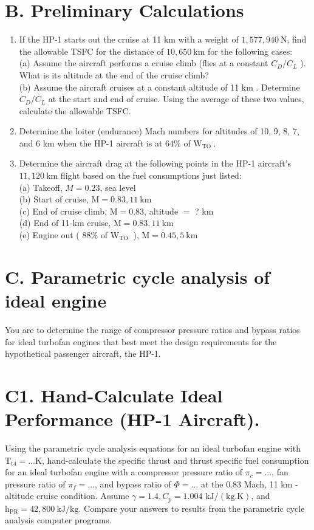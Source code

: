 \documentclass[10pt]{article}
\begin{document}
\section*{B. Preliminary Calculations}
\begin{enumerate}
  \item If the HP-1 starts out the cruise at 11 km with a weight of $1,577,940 \mathrm{~N}$, find the allowable TSFC for the distance of $10,650 \mathrm{~km}$ for the following cases:\\
(a) Assume the aircraft performs a cruise climb (flies at a constant $C_{D} / C_{L}$ ). What is its altitude at the end of the cruise climb?\\
(b) Assume the aircraft cruises at a constant altitude of 11 km . Determine $C_{D} / C_{L}$ at the start and end of cruise. Using the average of these two values, calculate the allowable TSFC.
  \item Determine the loiter (endurance) Mach numbers for altitudes of 10, 9, 8, 7, and 6 km when the HP-1 aircraft is at $64 \%$ of $\mathrm{W}_{\text {TO }}$.
  \item Determine the aircraft drag at the following points in the HP-1 aircraft's $11,120 \mathrm{~km}$ flight based on the fuel consumptions just listed:\\
(a) Takeoff, $M=0.23$, sea level\\
(b) Start of cruise, $\mathrm{M}=0.83,11 \mathrm{~km}$\\
(c) End of cruise climb, $\mathrm{M}=0.83$, altitude $=$ ? km\\
(d) End of 11-km cruise, $\mathrm{M}=0.83,11 \mathrm{~km}$\\
(e) Engine out ( $88 \%$ of $\mathrm{W}_{\text {TO }}$ ), $\mathrm{M}=0.45,5 \mathrm{~km}$
\end{enumerate}

\section*{C. Parametric cycle analysis of ideal engine}
You are to determine the range of compressor pressure ratios and bypass ratios for ideal turbofan engines that best meet the design requirements for the hypothetical passenger aircraft, the HP-1.

\section*{C1. Hand-Calculate Ideal Performance (HP-1 Aircraft).}
Using the parametric cycle analysis equations for an ideal turbofan engine with $\mathrm{T}_{\mathrm{t} 4}=\ldots \mathrm{K}$, hand-calculate the specific thrust and thrust specific fuel consumption for an ideal turbofan engine with a compressor pressure ratio of $\pi_{c}=\ldots$, fan pressure ratio of $\pi_{f}=\ldots$, and bypass ratio of $\Phi=\ldots$ at the 0.83 Mach, 11 km -altitude cruise condition. Assume $\gamma=1.4, C_{p}=1.004$ $\mathrm{kJ} /(\mathrm{kg} . \mathrm{K})$, and $\mathrm{h}_{\mathrm{PR}}=42,800 \mathrm{~kJ} / \mathrm{kg}$. Compare your answers to results from the parametric cycle analysis computer programs.
\end{document}
